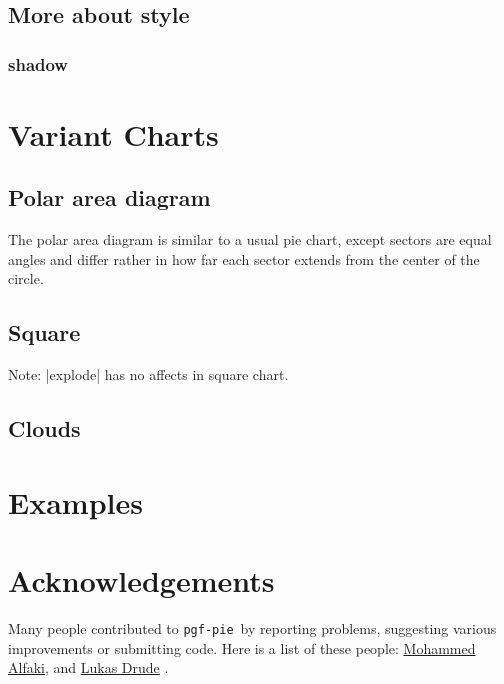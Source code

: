 \documentclass{ltxdoc}
\newcommand\pgfpiename{\texttt{pgf-pie}}
\begin{document}
\codeexample[scale=0.25,from file={demo/text-inside.tex}]

\codeexample[scale=0.25,from file={demo/legend.tex}]

\subsection{More about style}
\subsubsection{shadow}
\codeexample[scale=0.25,from file={demo/shadow.tex}]

\section{Variant Charts}
\subsection{Polar area diagram}
The polar area diagram is similar to a usual pie chart, except sectors
are equal angles and differ rather in how far each sector extends from
the center of the circle.

\codeexample[scale=0.25,from file={demo/polar.tex}]

\subsection{Square}

\codeexample[scale=0.25,from file={demo/square.tex}]

Note: |explode| has no affects in square chart.

\subsection{Clouds}

\codeexample[scale=0.25,from file={demo/cloud.tex}]

\section{Examples}


\section{Acknowledgements}
Many people contributed to \pgfpiename\ by reporting problems,
suggesting various improvements or submitting code. Here is a list of
these people:
\href{mailto:mohammed.alfaki@ii.uib.no}{Mohammed Alfaki},
and
\href{mailto:ldrude@mail.uni-paderborn.de}{Lukas Drude}
.
                                              
\end{document}
